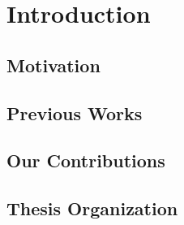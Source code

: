 \chapter{Introduction}

\section{Motivation}

\section{Previous Works}

\section{Our Contributions}

\section{Thesis Organization}
